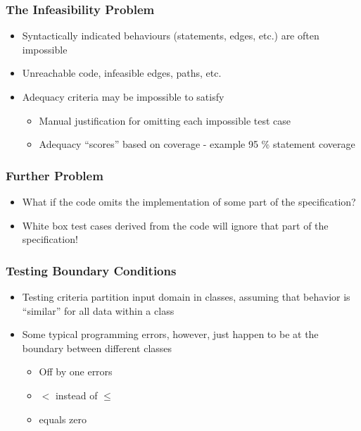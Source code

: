 \documentclass[t,12pt,numbers,fleqn]{beamer}
\begin{document}

\begin{frame}
\frametitle{The Infeasibility Problem}

\begin{itemize}
\item Syntactically indicated behaviours (statements, edges, etc.) are often impossible
\item Unreachable code, infeasible edges, paths, etc.
\item Adequacy criteria may be impossible to satisfy
\begin{itemize}
\item Manual justification for omitting each impossible test case
\item Adequacy ``scores'' based on coverage - example 95 \% statement coverage
\end{itemize}
\end{itemize}

\end{frame}


\begin{frame}
\frametitle{Further Problem}

\begin{itemize}
\item What if the code omits the implementation of some part of the specification?
\item White box test cases derived from the code will ignore that part of the specification!
\end{itemize}

\end{frame}


\begin{frame}
\frametitle{Testing Boundary Conditions}

\begin{itemize}

\item Testing criteria partition input domain in classes, assuming that behavior
  is ``similar'' for all data within a class
\item Some typical programming errors, however, just happen to be at the
  boundary between different classes
\begin{itemize}
\item Off by one errors
\item $<$ instead of $\leq$
\item equals zero
\end{itemize}
\end{itemize}

\end{frame}
\end{document}
